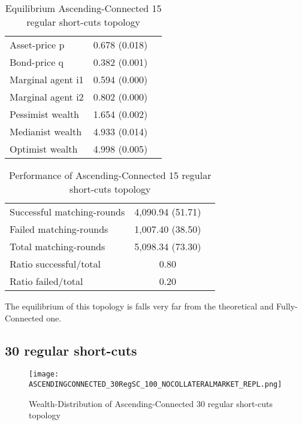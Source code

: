 \documentclass[Bachelorarbeit.tex]{subfiles}
\begin{document}
\begin{table}[H]
	\caption{Equilibrium Ascending-Connected 15 regular short-cuts topology}
	\centering
	\begin{tabular} { l c r }
		\hline
		Asset-price p & 0.678 (0.018) \\
		Bond-price q & 0.382 (0.001) \\
		Marginal agent i1 & 0.594 (0.000) \\
		Marginal agent i2 & 0.802 (0.000) \\
		\hline
		Pessimist wealth & 1.654 (0.002) \\
		Medianist wealth & 4.933 (0.014) \\
		Optimist wealth & 4.998 (0.005) \\
		\hline
	\end{tabular}
\end{table} 

\begin{table}[H]
	\caption{Performance of Ascending-Connected 15 regular short-cuts topology}
	\centering
	\begin{tabular} { l c r }
		\hline
		Successful matching-rounds & 4,090.94 (51.71) \\
		Failed matching-rounds & 1,007.40 (38.50) \\
		Total matching-rounds & 5,098.34 (73.30) \\
		\hline
		Ratio successful/total & 0.80 \\
		Ratio failed/total & 0.20 \\
		\hline
	\end{tabular}
\end{table}

The equilibrium of this topology is falls very far from the theoretical and Fully-Connected one.

\subsection{30 regular short-cuts}
\begin{figure}[H]
	\centering
  \texttt{[image: ASCENDINGCONNECTED\_30RegSC\_100\_NOCOLLATERALMARKET\_REPL.png]}
	\caption{Wealth-Distribution of Ascending-Connected 30 regular short-cuts topology}
	\label{fig:wealth_ASCENDINGCONNECTED_30RegSC_100_NOCOLLATERALMARKET_REPL}
\end{figure}
\end{document}

